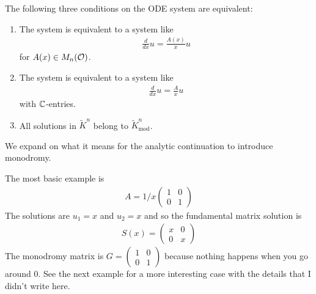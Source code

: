 \begin{theorem}
	The following three conditions on the ODE system are equivalent:
	\begin{enumerate}
		\item The system is equivalent to a system like \begin{align*}
			      \frac{d}{dx}u = \frac{A(x)}{x}u
		      \end{align*} for $A(x)\in M_n({\mathcal{O}})$.
		\item The system is equivalent to a system like \begin{align*}
			      \frac{d}{dx}u = \frac{A}{x}u
		      \end{align*} with $\mathbb{C}$-entries.
		\item All solutions in $\tilde K^n$ belong to $\tilde K_{\text{mod}}^n$.
	\end{enumerate}
\end{theorem}

We expand on what it means for the analytic continuation to introduce monodromy.

\begin{example}
	The most basic example is
	\begin{align*}
		A = 1/x\begin{pmatrix}
			       1 & 0 \\
			       0 & 1
		       \end{pmatrix}
	\end{align*}
	The solutions are $u_1 = x$ and $u_2 = x$ and so the fundamental matrix solution is
	\begin{align*}
		S(x) = \begin{pmatrix}
			       x & 0 \\
			       0 & x
		       \end{pmatrix}
	\end{align*} The monodromy matrix is $G = \begin{pmatrix}
			1 & 0 \\
			0 & 1
		\end{pmatrix}$ because nothing happens when you go around $0$. See the
	next example for a more interesting case with the details that I didn't write here.
\end{example}

